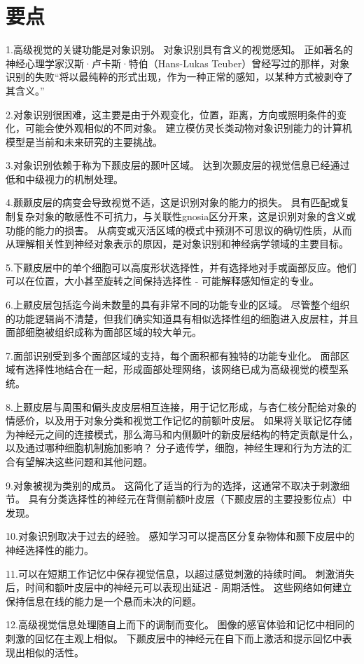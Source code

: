 \section{要点}

1.高级视觉的关键功能是对象识别。
对象识别具有含义的视觉感知。
正如著名的神经心理学家汉斯·卢卡斯·特伯（Hans-Lukas Teuber）曾经写过的那样，对象识别的失败“将以最纯粹的形式出现，作为一种正常的感知，以某种方式被剥夺了其含义。” 


2.对象识别很困难，这主要是由于外观变化，位置，距离，方向或照明条件的变化，可能会使外观相似的不同对象。
建立模仿灵长类动物对象识别能力的计算机模型是当前和未来研究的主要挑战。


3.对象识别依赖于称为下颞皮层的颞叶区域。
达到次颞皮层的视觉信息已经通过低和中级视力的机制处理。


4.颞颞皮层的病变会导致视觉不适，这是识别对象的能力的损失。
具有匹配或复制复杂对象的敏感性不可抗力，与关联性gnosia区分开来，这是识别对象的含义或功能的能力的损害。
从病变或灭活区域的模式中预测不可思议的确切性质，从而从理解相关性到神经对象表示的原因，是对象识别和神经病学领域的主要目标。 


5.下颞皮层中的单个细胞可以高度形状选择性，并有选择地对手或面部反应。他们可以在位置，大小甚至旋转之间保持选择性 - 可能解释感知恒定的专业。


6.上颞皮层包括迄今尚未数量的具有非常不同的功能专业的区域。
尽管整个组织的功能逻辑尚不清楚，但我们确实知道具有相似选择性组的细胞进入皮层柱，并且面部细胞被组织成称为面部区域的较大单元。 


7.面部识别受到多个面部区域的支持，每个面积都有独特的功能专业化。
面部区域有选择性地结合在一起，形成面部处理网络，该网络已成为高级视觉的模型系统。


8.上颞皮层与周围和偏头皮皮层相互连接，用于记忆形成，与杏仁核分配给对象的情感价，以及用于对象分类和视觉工作记忆的前额叶皮层。
如果将关联记忆存储为神经元之间的连接模式，那么海马和内侧颞叶的新皮层结构的特定贡献是什么，以及通过哪种细胞机制施加影响？
分子遗传学，细胞，神经生理和行为方法的汇合有望解决这些问题和其他问题。


9.对象被视为类别的成员。
这简化了适当的行为的选择，这通常不取决于刺激细节。 具有分类选择性的神经元在背侧前额叶皮层（下颞皮层的主要投影位点）中发现。


10.对象识别取决于过去的经验。
感知学习可以提高区分复杂物体和颞下皮层中的神经选择性的能力。


11.可以在短期工作记忆中保存视觉信息，以超过感觉刺激的持续时间。
刺激消失后，时间和额叶皮层中的神经元可以表现出延迟 - 周期活性。
这些网络如何建立保持信息在线的能力是一个悬而未决的问题。


12.高级视觉信息处理随自上而下的调制而变化。
图像的感官体验和记忆中相同的刺激的回忆在主观上相似。
下颞皮层中的神经元在自下而上激活和提示回忆中表现出相似的活性。



